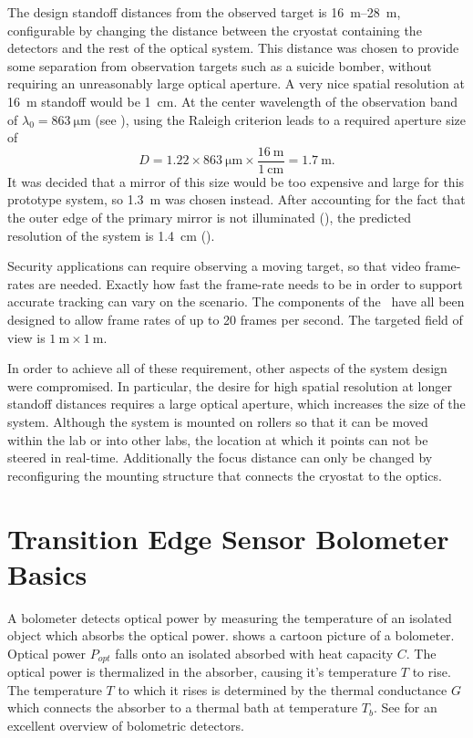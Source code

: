 The design standoff distances from the observed target is \SIrange{16}{28}{\m}, configurable by changing the distance between the cryostat containing the detectors and the rest of the optical system.
This distance was chosen to provide some separation from observation targets such as a suicide bomber, without requiring an unreasonably large optical aperture.
A very nice spatial resolution at \SI{16}{\m} standoff would be \SI{1}{\cm}.
At the center wavelength of the observation band of $\lambda_0 = \SI{863}{\um}$ (see ), using the Raleigh criterion  leads to a required aperture size of
\begin{equation}
  D = 1.22 \times \SI{863}{\um} \times \frac{\SI{16}{\m}}{\SI{1}{\cm}} = \SI{1.7}{\m}.
\end{equation}
It was decided that a mirror of this size would be too expensive and large for this prototype system, so \SI{1.3}{\m} was chosen instead.
After accounting for the fact that the outer edge of the primary mirror is not illuminated (), the predicted resolution of the system is \SI{1.4}{\cm} ().

Security applications can require observing a moving target, so that video frame-rates are needed.
Exactly how fast the frame-rate needs to be in order to support accurate tracking can vary on the scenario.
The components of the \Imager\ have all been designed to allow frame rates of up to 20 frames per second.
The targeted field of view is $\SI{1}{\m} \times \SI{1}{\m}$.

In order to achieve all of these requirement, other aspects of the system design were compromised.
In particular, the desire for high spatial resolution at longer standoff distances requires a large optical aperture, which increases the size of the system.
Although the system is mounted on rollers so that it can be moved within the lab or into other labs, the location at which it points can not be steered in real-time.
Additionally the focus distance can only be changed by reconfiguring the mounting structure that connects the cryostat to the optics.

\section{Transition Edge Sensor Bolometer Basics}

A bolometer detects optical power by measuring the temperature of an isolated object which absorbs the optical power.
 shows a cartoon picture of a bolometer.
Optical power $P_{opt}$ falls onto an isolated absorbed with heat capacity $C$.
The optical power is thermalized in the absorber, causing it's temperature $T$ to rise.
The temperature $T$ to which it rises is determined by the thermal conductance $G$ which connects the absorber to a thermal bath at temperature $T_b$.
See \cite{richards_bolometers_1994} for an excellent overview of bolometric detectors.

